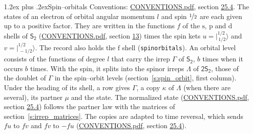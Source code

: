 \documentclass[10pt,a4paper]{article}
\makeatletter
\renewcommand\section{\@startsection{section}{1}{\z@}{-3ex plus -1ex minus -.2ex}%
  {1.2ex plus .2ex}{\normalfont\large\sffamily\bfseries\color{parttitle}}}
\numberwithin{equation}{section}
\newcommand{\grp}[1]{\mathsf{#1}}
\newcommand{\orbital}[1]{\mathrm{#1}}
\newcommand{\mult}{\kappa}
\newcommand{\intx}{\mu}
\newcommand{\jm}[2]{\bigl\lvert{}^{#1}_{\,#2}\bigr\rangle}
\makeatother
\begin{document}
\section{Spin--orbitals}\label{s:spin_orbitals}
Conventions: \href{../../CONVENTIONS.pdf}{CONVENTIONS.pdf}, section \href{../../CONVENTIONS.pdf\#conv.25.4}{25.4}.
\leavevmode\label{n:index.orbital.l}The states of an electron of orbital angular momentum $l$ and spin $\nicefrac{1}{2}$ are each given up to a positive factor. \label{n:local.spinor.uv}\label{n:local.function.f}They are written in the functions $f$ of the $\orbital{s}$, $\orbital{p}$ and $\orbital{d}$ shells of \href{../../../rotation/data/pdf/S2.pdf}{$\grp{S_{2}}$} (\href{../../CONVENTIONS.pdf}{CONVENTIONS.pdf}, section \href{../../../rotation/CONVENTIONS.pdf\#conv.13}{13}) times the spin kets $u = \jm{1/2}{1/2}$ and $v = \jm{1/2}{-1/2}$. The record also holds the $\orbital{f}$ shell (\texttt{spinorbitals}). An orbital level consists of the functions of degree $l$ that carry the irrep $\Gamma$ of \href{../../../rotation/data/pdf/S2.pdf}{$\grp{S_{2}}$}, $b$ times when it occurs $b$ times. With the spin, it splits into the spinor irreps $\Lambda$ of $\grp{2S_{2}}$, those of the doublet of $\Gamma$ in the spin--orbit levels (section~\ref{s:spin_orbit}, first column). \label{n:head.state}Under the heading of its shell, a row gives $\Gamma$, a copy $\mult$ of $\Lambda$ (when there are several), its partner $\intx$ and the state. The normalized state (\href{../../CONVENTIONS.pdf}{CONVENTIONS.pdf}, section \href{../../CONVENTIONS.pdf\#conv.25.4}{25.4}) follows the partner law with the matrices of section~\ref{s:irrep_matrices}. The copies are adapted to time reversal, which sends $f u$ to $f v$ and $f v$ to $-f u$ (\href{../../CONVENTIONS.pdf}{CONVENTIONS.pdf}, section \href{../../CONVENTIONS.pdf\#conv.25.4}{25.4}).
\end{document}
